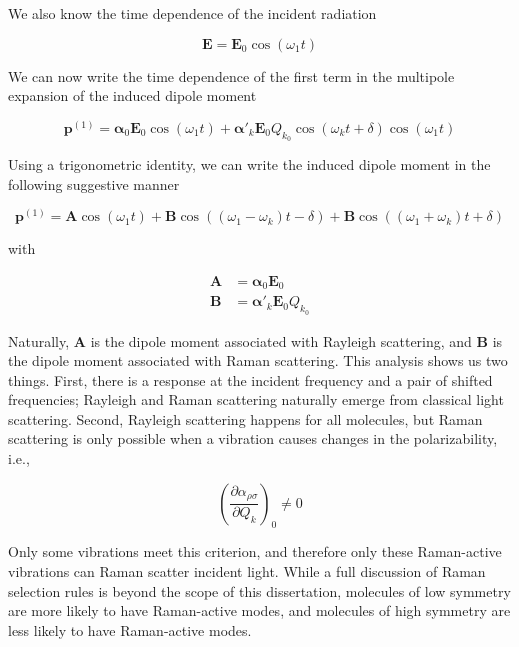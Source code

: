 We also know the time dependence of the incident radiation

\begin{equation}
\mathbf{E} = \mathbf{E}_{0} \cos (\omega_{1} t)
\end{equation}

We can now write the time dependence of the first term in the multipole expansion of the induced dipole moment

\begin{equation}
\mathbf{p}^{(1)} = \boldsymbol{\alpha}_{0} \mathbf{E}_{0} \cos (\omega_{1} t) + \boldsymbol{\alpha}'_{k} \mathbf{E}_{0} Q_{k_{0}} \cos (\omega_{k} t + \delta) \cos (\omega_{1} t)
\end{equation}

Using a trigonometric identity, we can write the induced dipole moment in the following suggestive manner

\begin{equation}
\mathbf{p}^{(1)} = \mathbf{A} \cos (\omega_{1} t) + \mathbf{B} \cos ((\omega_{1} - \omega_{k}) t - \delta) + \mathbf{B} \cos ((\omega_{1} + \omega_{k}) t + \delta)
\end{equation}

with

\begin{equation}
\begin{aligned}
	\mathbf{A} &= \boldsymbol{\alpha}_{0} \mathbf{E}_{0} \\
	\mathbf{B} &= \boldsymbol{\alpha}'_{k} \mathbf{E}_{0} Q_{k_{0}}
\end{aligned}
\end{equation}

Naturally, $\mathbf{A}$ is the dipole moment associated with Rayleigh scattering, and $\mathbf{B}$ is the dipole moment associated with Raman scattering. This analysis shows us two things. First, there is a response at the incident frequency and a pair of shifted frequencies; Rayleigh and Raman scattering naturally emerge from classical light scattering. Second, Rayleigh scattering happens for all molecules, but Raman scattering is only possible when a vibration causes changes in the polarizability, i.e.,

\begin{equation}
\left( \frac{\partial \alpha_{\rho \sigma}}{\partial Q_{k}} \right)_{0} \neq 0
\end{equation}

Only some vibrations meet this criterion, and therefore only these Raman-active vibrations can Raman scatter incident light. While a full discussion of Raman selection rules is beyond the scope of this dissertation, molecules of low symmetry are more likely to have Raman-active modes, and molecules of high symmetry are less likely to have Raman-active modes.

